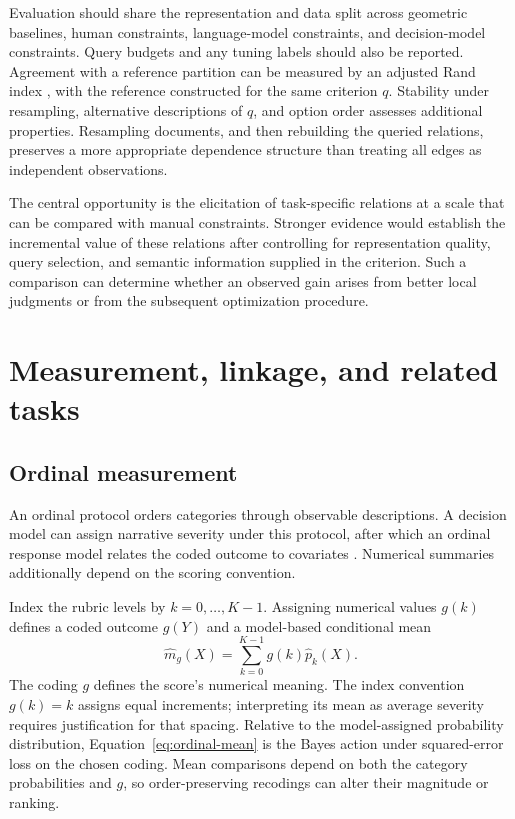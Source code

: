 \documentclass[11pt,a4paper]{article}
\begin{document}
Evaluation should share the representation and data split across geometric baselines, human constraints, language-model constraints, and decision-model constraints. Query budgets and any tuning labels should also be reported. Agreement with a reference partition can be measured by an adjusted Rand index \citep{hubert1985}, with the reference constructed for the same criterion $q$. Stability under resampling, alternative descriptions of $q$, and option order assesses additional properties. Resampling documents, and then rebuilding the queried relations, preserves a more appropriate dependence structure than treating all edges as independent observations.

The central opportunity is the elicitation of task-specific relations at a scale that can be compared with manual constraints. Stronger evidence would establish the incremental value of these relations after controlling for representation quality, query selection, and semantic information supplied in the criterion. Such a comparison can determine whether an observed gain arises from better local judgments or from the subsequent optimization procedure.

\section{Measurement, linkage, and related tasks}\label{sec:measurement}

\subsection{Ordinal measurement}

An ordinal protocol orders categories through observable descriptions. A decision model can assign narrative severity under this protocol, after which an ordinal response model relates the coded outcome to covariates \citep{mccullagh1980}. Numerical summaries additionally depend on the scoring convention.

Index the rubric levels by $k=0,\ldots,K-1$. Assigning numerical values $g(k)$ defines a coded outcome $g(Y)$ and a model-based conditional mean
\begin{equation}
 \widehat m_g(X)=\sum_{k=0}^{K-1}g(k)\widehat p_k(X).
 \label{eq:ordinal-mean}
\end{equation}
The coding $g$ defines the score's numerical meaning. The index convention $g(k)=k$ assigns equal increments; interpreting its mean as average severity requires justification for that spacing. Relative to the model-assigned probability distribution, Equation~\eqref{eq:ordinal-mean} is the Bayes action under squared-error loss on the chosen coding. Mean comparisons depend on both the category probabilities and $g$, so order-preserving recodings can alter their magnitude or ranking.
\end{document}

